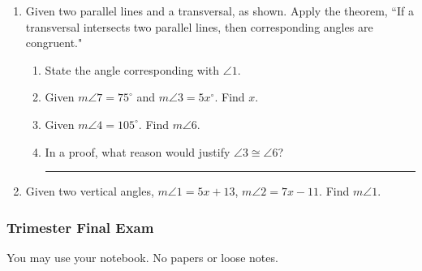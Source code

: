 \documentclass[12pt, oneside]{article}
\begin{document}
\begin{enumerate}
\newpage
\item Given two parallel lines and a transversal, as shown. Apply the theorem, ``If a transversal intersects two parallel lines, then corresponding angles are congruent."
  \begin{center}
  \end{center}
  \begin{enumerate}
    \item State the angle corresponding with $\angle 1$. \bigskip
    \item Given $m\angle 7 = 75^\circ$ and $m\angle 3 = 5x^\circ$. Find $x$. \bigskip
    \item Given $m\angle 4 = 105^\circ$. Find $m\angle 6$. \bigskip
    \item In a proof, what reason would justify $\angle 3 \cong \angle 6$? \rule{6cm}{0.15mm}
  \end{enumerate}

  \item Given two vertical angles, $m \angle 1 = 5x+13$, $m \angle 2 = 7x-11$. Find $m \angle 1$.
      \begin{flushright}
      \end{flushright}

  \end{enumerate}

\newpage %
\setcounter{page}{1}
\subsubsection*{Trimester Final Exam}
You may use your notebook. No papers or loose notes.
\end{document}

